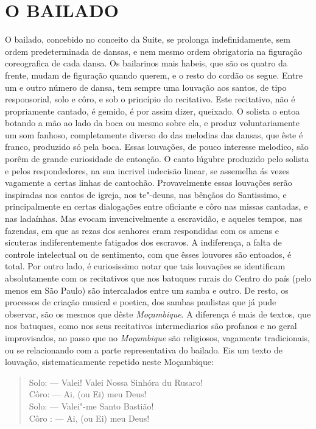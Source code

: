\section{O BAILADO}

O bailado, concebido no conceito da Suite, se prolonga indefinidamente,
sem ordem predeterminada de dansas, e nem mesmo ordem obrigatoria na
figuração coreografica de cada dansa. Os bailarinos mais habeis, que são
os quatro da frente, mudam de figuração quando querem, e o resto do
cordão os segue. Entre um e outro número de dansa, tem sempre uma
louvação aos santos, de tipo responsorial, solo e côro, e sob o
princípio do recitativo. Este recitativo, não é propriamente cantado, é
gemido, é por assim dizer, queixado. O solista o entoa botando a mão ao
lado da boca ou mesmo sobre ela, e produz voluntariamente um som
fanhoso, completamente diverso do das melodias das dansas, que êste é
franco, produzido só pela boca. Essas louvações, de pouco interesse
melodico, são porêm de grande curiosidade de entoação. O canto lúgubre
produzido pelo solista e pelos respondedores, na sua incrivel indecisão
linear, se assemelha ás vezes vagamente a certas linhas de cantochão.
Provavelmente essas louvações serão inspiradas nos cantos de igreja, nos
te"-deuns, nas bênçãos do Santissimo, e principalmente en certas
dialogações entre oficiante e côro nas missas cantadas, e nas ladaínhas.
Mas evocam invencivelmente a escravidão, e aqueles tempos, nas fazendas,
em que as rezas dos senhores eram respondidas com os amens e sicuteras
indiferentemente fatigados dos escravos. A indiferença, a falta de
controle intelectual ou de sentimento, com que êsses louvores são
entoados, é total. Por outro lado, é curiosissimo notar que tais
louvações se identificam absolutamente com os recitativos que nos
batuques rurais do Centro do país (pelo menos em São Paulo) são
intercalados entre um samba e outro. De resto, os processos de criação
musical e poetica, dos sambas paulistas que já pude observar, são os
mesmos que dêste \emph{Moçambique}. A diferença é mais de textos, que
nos batuques, como nos seus recitativos intermediarios são profanos e no
geral improvisados, ao passo que no \emph{Moçambique} são religiosos,
vagamente tradicionais, ou se relacionando com a parte representativa do
bailado. Eis um texto de louvação, sistematicamente repetido neste
Moçambique:

\begin{verse}
Solo: --- Valei! Valei Nossa Sinhóra du Rusaro!\\
Côro: --- Ai, (ou Ei) meu Deus!\\
Solo: --- Valei"-me Santo Bastião!\\
Côro : --- Ai, (ou Ei) meu Deus!
\end{verse}

